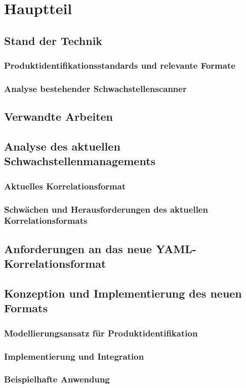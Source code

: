 \chapter{Hauptteil}


\section{Stand der Technik}

\subsection{Produktidentifikationsstandards und relevante Formate}

\subsection{Analyse bestehender Schwachstellenscanner}


\section{Verwandte Arbeiten}


\section{Analyse des aktuellen Schwachstellenmanagements}

\subsection{Aktuelles Korrelationsformat}

\subsection{Schwächen und Herausforderungen des aktuellen Korrelationsformats}


\section{Anforderungen an das neue YAML-Korrelationsformat}


\section{Konzeption und Implementierung des neuen Formats}

\subsection{Modellierungsansatz für Produktidentifikation}

\subsection{Implementierung und Integration}

\subsection{Beispielhafte Anwendung}
